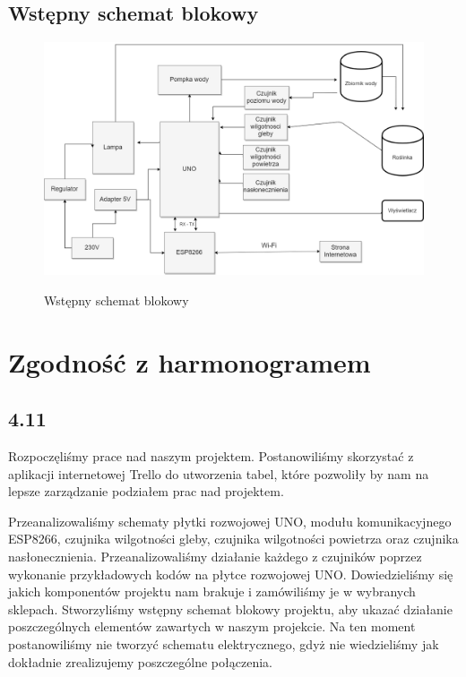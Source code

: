 \documentclass[12pt]{article}
\begin{document}
\subsection{Wstępny schemat blokowy}
\begin{figure}[!h]
  \begin{center}
    {\includegraphics[width=16cm]{schemat_blokowy.png}}
  \end{center}
  \caption{Wstępny schemat blokowy}
\end{figure}


\section{Zgodność z harmonogramem}
\subsection{4.11}
Rozpoczęliśmy prace nad naszym projektem. Postanowiliśmy skorzystać z aplikacji internetowej Trello do utworzenia tabel, które pozwoliły by nam na lepsze zarządzanie podziałem prac nad projektem.

Przeanalizowaliśmy schematy płytki rozwojowej UNO, modułu komunikacyjnego ESP8266, czujnika wilgotności gleby, czujnika wilgotności powietrza oraz czujnika nasłonecznienia. Przeanalizowaliśmy działanie każdego z czujników poprzez wykonanie przykładowych kodów na płytce rozwojowej UNO. Dowiedzieliśmy się jakich komponentów projektu nam brakuje i zamówiliśmy je w wybranych sklepach.
Stworzyliśmy wstępny schemat blokowy projektu, aby ukazać działanie poszczególnych elementów zawartych w naszym projekcie. Na ten moment postanowiliśmy nie tworzyć schematu elektrycznego, gdyż nie wiedzieliśmy jak dokładnie zrealizujemy poszczególne połączenia.
\end{document}

